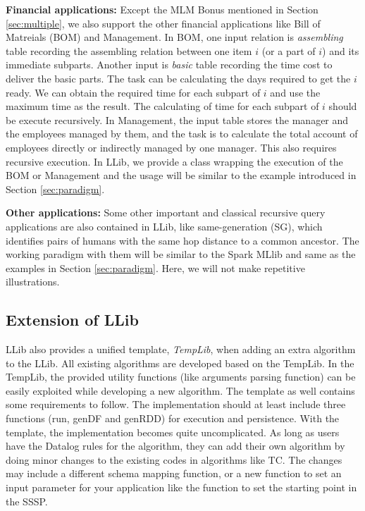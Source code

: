 \textbf{Financial   applications:}
Except the MLM Bonus mentioned in Section \ref{sec:multiple}, we also support the other financial applications like Bill of Matreials (BOM) \citep{BOM} and  Management. In BOM, one input relation is \textit{assembling} table recording the assembling relation between one item $i$ (or a part of $i$) and its immediate subparts. Another input is \textit{basic} table recording the time cost to deliver the basic parts. The task can be calculating the days required to get  the $i$ ready. We can obtain the required time for each subpart of $i$ and use the maximum time as the result. The calculating of time for each subpart of $i$ should be  execute recursively. In Management, the input table stores the manager and the employees managed by them, and the task is to calculate the total account of employees directly or indirectly managed by one manager. This also requires recursive execution. In LLib, we provide a class wrapping the execution of the BOM or Management and the usage will be similar to the example introduced in Section \ref{sec:paradigm}.

\textbf{Other applications:}
Some other important and classical recursive query applications are also contained in LLib, like same-generation (SG), which identifies pairs of humans with the same hop distance to a common ancestor.  The working paradigm with them will be similar to the Spark MLlib and same as the examples in Section \ref{sec:paradigm}. Here, we will not make repetitive illustrations.

\subsection{Extension of LLib}
LLib also provides a unified template, \textit{TempLib}, when adding an extra algorithm to the LLib. All existing algorithms are developed based on the TempLib. In the TempLib, the provided utility functions (like arguments parsing function) can be easily exploited while developing a new algorithm. The template as well contains some requirements to follow. The implementation should at least include three functions (run, genDF and genRDD) for execution and persistence. With the template, the implementation becomes quite uncomplicated. As long as users have the Datalog rules for the algorithm, they can add their own algorithm by doing minor changes to the existing codes in algorithms like TC. The changes may include a different schema mapping function, or a new function to set an input parameter for your application like the function to set the starting point in the SSSP. 

